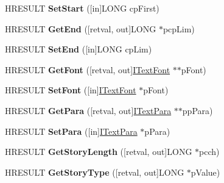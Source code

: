 \begin{DoxyCompactItemize}
\item 
\mbox{\label{interface_i_text_range_a86e407088b10aa4c9c52d51d2a7d0105}} 
H\+R\+E\+S\+U\+LT {\bfseries Set\+Start} (\mbox{[}in\mbox{]}L\+O\+NG cp\+First)
\item 
\mbox{\label{interface_i_text_range_a18765b56b0c0ba17025e7db0a50611fa}} 
H\+R\+E\+S\+U\+LT {\bfseries Get\+End} (\mbox{[}retval, out\mbox{]}L\+O\+NG $\ast$pcp\+Lim)
\item 
\mbox{\label{interface_i_text_range_a2e56eb717106a66d93a1778e0c622952}} 
H\+R\+E\+S\+U\+LT {\bfseries Set\+End} (\mbox{[}in\mbox{]}L\+O\+NG cp\+Lim)
\item 
\mbox{\label{interface_i_text_range_a0c1e792dd147bba609dde4c9f46b6024}} 
H\+R\+E\+S\+U\+LT {\bfseries Get\+Font} (\mbox{[}retval, out\mbox{]}\hyperlink{interface_i_text_font}{I\+Text\+Font} $\ast$$\ast$p\+Font)
\item 
\mbox{\label{interface_i_text_range_ab7a75f87d00b6c28170ccb1d00f6f0bd}} 
H\+R\+E\+S\+U\+LT {\bfseries Set\+Font} (\mbox{[}in\mbox{]}\hyperlink{interface_i_text_font}{I\+Text\+Font} $\ast$p\+Font)
\item 
\mbox{\label{interface_i_text_range_a6a240a852615dff9ec75bbf911082675}} 
H\+R\+E\+S\+U\+LT {\bfseries Get\+Para} (\mbox{[}retval, out\mbox{]}\hyperlink{interface_i_text_para}{I\+Text\+Para} $\ast$$\ast$pp\+Para)
\item 
\mbox{\label{interface_i_text_range_ac52012e3f20a17135f14323f32d781bd}} 
H\+R\+E\+S\+U\+LT {\bfseries Set\+Para} (\mbox{[}in\mbox{]}\hyperlink{interface_i_text_para}{I\+Text\+Para} $\ast$p\+Para)
\item 
\mbox{\label{interface_i_text_range_a2c2926daeeae40acbdbc9654512ad937}} 
H\+R\+E\+S\+U\+LT {\bfseries Get\+Story\+Length} (\mbox{[}retval, out\mbox{]}L\+O\+NG $\ast$pcch)
\item 
\mbox{\label{interface_i_text_range_a2b5270efded12d54cd14120bdd519765}} 
H\+R\+E\+S\+U\+LT {\bfseries Get\+Story\+Type} (\mbox{[}retval, out\mbox{]}L\+O\+NG $\ast$p\+Value)

\end{DoxyCompactItemize}
